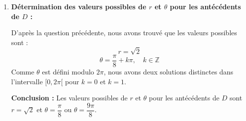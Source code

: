 \documentclass[a4paper,12pt]{article}
\begin{document}
\begin{solutionbox}
\begin{enumerate}
\begin{enumerate}
    \end{enumerate}

    \item \textbf{Détermination des valeurs possibles de \( r \) et \( \theta \) pour les antécédents de \( D \) :}

    D'après la question précédente, nous avons trouvé que les valeurs possibles sont :
    \[
    r = \sqrt{2}
    \]
    \[
    \theta = \dfrac{\pi}{8} + k\pi, \quad k \in \mathbb{Z}
    \]
    Comme \( \theta \) est défini modulo \( 2\pi \), nous avons deux solutions distinctes dans l'intervalle \( [0, 2\pi[ \) pour \( k = 0 \) et \( k = 1 \).

    \textbf{Conclusion :} Les valeurs possibles de \( r \) et \( \theta \) pour les antécédents de \( D \) sont \( r = \sqrt{2} \) et \( \theta = \dfrac{\pi}{8} \) ou \( \theta = \dfrac{9\pi}{8} \).

\end{enumerate}
\end{solutionbox}
\end{document}
